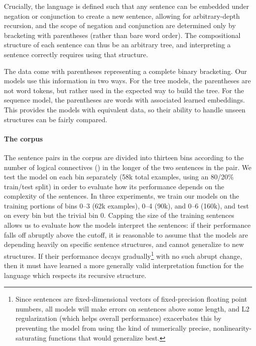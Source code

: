 Crucially, the language is defined such that any sentence can be embedded under negation or conjunction to create a new sentence, allowing for arbitrary-depth recursion, and the scope of negation and conjunction are determined only by bracketing with parentheses (rather than bare word order). The compositional structure of each sentence can thus be an arbitrary tree, and interpreting a sentence correctly requires using that structure.

The data come with parentheses representing a complete binary bracketing. Our models use this information in two ways. For the tree models, the parentheses are not word tokens, but rather used in the expected way to build the tree. For the sequence model, the parentheses are words with associated learned embeddings. This provides the models with equivalent data, so their ability to handle unseen structures can be fairly compared.

\paragraph{The corpus}
The sentence pairs in the corpus are divided into thirteen bins according to the number of logical connectives () in the longer of the two sentences in the pair. We test the model on each bin separately (58k total examples, using an 80/20\% train/test split) in order to evaluate how its performance depends on the complexity of the sentences. In three experiments, we train our models on the training portions of bins 0--3 (62k examples), 0--4 (90k), and 0--6 (160k), and test on every bin but the trivial bin 0. Capping the size of the training sentences allows us to evaluate how the models interpret the sentences: if their performance falls off abruptly above the cutoff, it is reasonable to assume that the models are depending heavily on specific sentence structures, and cannot generalize to new structures. If their performance decays gradually\footnote{Since sentences are fixed-dimensional vectors of fixed-precision floating point numbers, all models will make errors on sentences above some length, and L2 regularization (which helps overall performance) exacerbates this by preventing the model from using the kind of numerically precise, nonlinearity-saturating functions that would generalize best.} with no such abrupt change, then it must have learned a more generally valid interpretation function for the language which respects its recursive structure.



